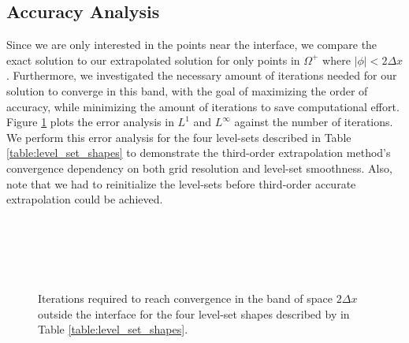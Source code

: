 \documentclass[oneside,12pt,final]{/Applications/TeX/packages/ucthesis-CA2012}
\begin{document}
\begin{mainmatter}
\section{Accuracy Analysis}

Since we are only interested in the points near the interface, we compare the exact solution to our extrapolated solution for only points in $\Omega^+$ where $|\phi| < 2 \Delta x$. Furthermore, we investigated the necessary amount of iterations needed for our solution to converge in this band, with the goal of maximizing the order of accuracy, while minimizing the amount of iterations to save computational effort. Figure \ref{fig:Third_Order_Iterations} plots the error analysis in $L^1$ and $L^\infty$ against the number of iterations. We perform this error analysis for the four level-sets described in Table \ref{table:level_set_shapes} to demonstrate the third-order extrapolation method's convergence dependency on both grid resolution and level-set smoothness. Also, note that we had to reinitialize the level-sets before third-order accurate extrapolation could be achieved.

\begin{figure} [!h]
\centering
{} \quad
{}\\
 \quad
{}\\
 \quad
{}\\
 \quad
{}\\
  \caption[Iterations to Reach Convergence for Third-Order Extrapolation]{Iterations required to reach convergence in the band of space $2 \Delta x$ outside the interface for the four level-set shapes described by in Table \ref{table:level_set_shapes}.}
  \label{fig:Third_Order_Iterations}
\end{figure}


\end{mainmatter}
\end{document}
